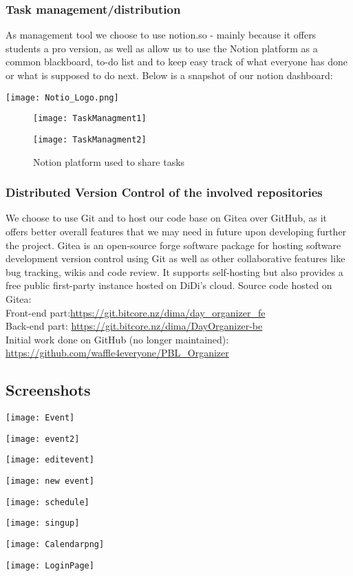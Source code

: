 \subsubsection{Task management/distribution}
\par As management tool we choose to use notion.so - mainly because it offers students a pro version, as well as allow us to use the Notion platform as a common blackboard, to-do list and to keep easy track of what everyone has done or what is supposed to do next.
Below is a snapshot of our notion dashboard:
\par 
\texttt{[image: Notio\_Logo.png]}
\par
\begin{figure}[!h]

	
	
	\texttt{[image: TaskManagment1]}
	
	\texttt{[image: TaskManagment2]}
	\caption {Notion platform used to share tasks}
\end{figure}


\subsubsection{Distributed Version Control of the involved repositories}
\par We choose to use Git and to host our code base on Gitea over GitHub, as it offers better overall features that we may need in future upon developing further the project. 
Gitea is an open-source forge software package for hosting software development version control using Git as well as other collaborative features like bug tracking, wikis and code review. It supports self-hosting but also provides a free public first-party instance hosted on DiDi's cloud.
Source code hosted on Gitea:\\
 Front-end part:\url{https://git.bitcore.nz/dima/day_organizer_fe}\\
 Back-end part: \url{https://git.bitcore.nz/dima/DayOrganizer-be}\\
 Initial work done on GitHub (no longer maintained):\url{ https://github.com/waffle4everyone/PBL_Organizer	}
 \subsection{Screenshots}
 \par
 \texttt{[image: Event]}
 \par
 \texttt{[image: event2]}
 \par
 \texttt{[image: editevent]}
 \par
 \texttt{[image: new event]}
 \par
 \texttt{[image: schedule]}
 \par
 \texttt{[image: singup]}
 \par
 \texttt{[image: Calendarpng]}
 \par
 \texttt{[image: LoginPage]}
 


\clearpage
